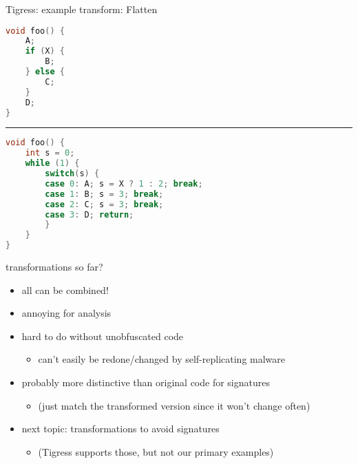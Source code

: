 \begin{frame}[fragile,label=TigressFlatten]{Tigress: example transform: Flatten}
\begin{lstlisting}[language=C++,style=size10]
void foo() {
    A;
    if (X) {
        B;
    } else {
        C;
    }
    D;
}
\end{lstlisting}
\hrule
\begin{lstlisting}[language=C++,style=size10]
void foo() {
    int s = 0;
    while (1) { 
        switch(s) {
        case 0: A; s = X ? 1 : 2; break;
        case 1: B; s = 3; break;
        case 2: C; s = 3; break;
        case 3: D; return;
        }
    }
}
\end{lstlisting}
\end{frame}

\begin{frame}{transformations so far?}
    \begin{itemize}
    \item all can be combined!
    \item annoying for analysis
    \item hard to do without unobfuscated code
        \begin{itemize}
        \item can't easily be redone/changed by self-replicating malware
        \end{itemize}
    \item probably more distinctive than original code for signatures
        \begin{itemize}
        \item (just match the transformed version since it won't change often)
        \end{itemize}
    \vspace{.5cm}
    \item next topic: transformations to avoid signatures
        \begin{itemize}
        \item (Tigress supports those, but not our primary examples)
        \end{itemize}
    \end{itemize}
\end{frame}
